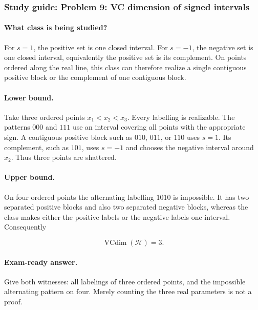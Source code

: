 \documentclass[11pt,a4paper]{article}
\DeclareMathOperator{\VCdim}{VCdim}
\begin{document}
\subsubsection{Study guide: Problem 9: VC dimension of signed intervals}

\paragraph{What class is being studied?}

For $s=1$, the positive set is one closed interval. For $s=-1$, the negative set is one closed interval, equivalently the positive set is its complement. On points ordered along the real line, this class can therefore realize a single contiguous positive block or the complement of one contiguous block.

\paragraph{Lower bound.}

Take three ordered points $x_1<x_2<x_3$. Every labelling is realizable. The patterns $000$ and $111$ use an interval covering all points with the appropriate sign. A contiguous positive block such as $010$, $011$, or $110$ uses $s=1$. Its complement, such as $101$, uses $s=-1$ and chooses the negative interval around $x_2$. Thus three points are shattered.

\paragraph{Upper bound.}

On four ordered points the alternating labelling $1010$ is impossible. It has two separated positive blocks and also two separated negative blocks, whereas the class makes either the positive labels or the negative labels one interval. Consequently

\[
\VCdim(\mathcal{H})=3.
\]

\paragraph{Exam-ready answer.}

Give both witnesses: all labelings of three ordered points, and the impossible alternating pattern on four. Merely counting the three real parameters is not a proof.
\end{document}
